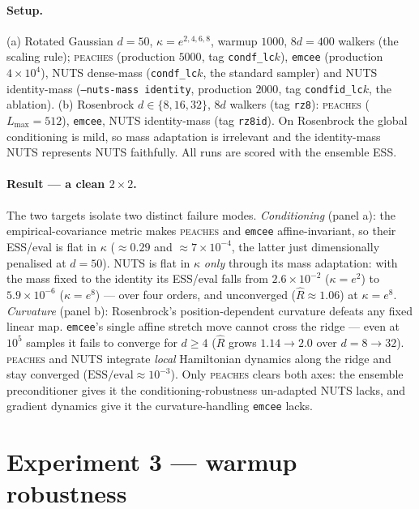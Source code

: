 \documentclass[11pt]{article}
\begin{document}
\paragraph{Setup.} (a) Rotated Gaussian $d{=}50$, $\kappa=e^{2,4,6,8}$, warmup
$1000$, $8d{=}400$ walkers (the scaling rule); \textsc{peaches} (production
$5000$, tag \texttt{condf\_lc$k$}), \texttt{emcee} (production $4\!\times\!10^4$),
NUTS dense-mass (\texttt{condf\_lc$k$}, the standard sampler) and NUTS
identity-mass (\texttt{--nuts-mass identity}, production $2000$, tag
\texttt{condfid\_lc$k$}, the ablation). (b) Rosenbrock $d\in\{8,16,32\}$, $8d$
walkers (tag \texttt{rz8}): \textsc{peaches} ($L_{\max}=512$), \texttt{emcee},
NUTS identity-mass (tag \texttt{rz8id}). On Rosenbrock the global conditioning is
mild, so mass adaptation is irrelevant and the identity-mass NUTS represents NUTS
faithfully. All runs are scored with the ensemble ESS.

\paragraph{Result --- a clean $2\times2$.} The two targets isolate two distinct
failure modes. \emph{Conditioning} (panel a): the empirical-covariance metric
makes \textsc{peaches} and \texttt{emcee} affine-invariant, so their ESS/eval is
flat in $\kappa$ ($\approx\!0.29$ and $\approx\!7\times10^{-4}$, the latter just
dimensionally penalised at $d{=}50$). NUTS is flat in $\kappa$ \emph{only}
through its mass adaptation: with the mass fixed to the identity its ESS/eval
falls from $2.6\times10^{-2}$ ($\kappa=e^2$) to $5.9\times10^{-6}$
($\kappa=e^8$) --- over four orders, and unconverged ($\hat R\!\approx\!1.06$) at
$\kappa=e^8$.
\emph{Curvature} (panel b): Rosenbrock's position-dependent curvature defeats
any fixed linear map. \texttt{emcee}'s single affine stretch move cannot cross
the ridge --- even at $10^5$ samples it fails to converge for $d\ge4$
($\hat R$ grows $1.14\!\to\!2.0$ over $d{=}8\!\to\!32$). \textsc{peaches} and
NUTS integrate \emph{local} Hamiltonian dynamics along the ridge and stay
converged ($\text{ESS}/\text{eval}\approx10^{-3}$). Only \textsc{peaches} clears
both axes: the ensemble preconditioner gives it the conditioning-robustness
un-adapted NUTS lacks, and gradient dynamics give it the curvature-handling
\texttt{emcee} lacks.

\section{Experiment 3 --- warmup robustness}\label{sec:warmup}
\end{document}
